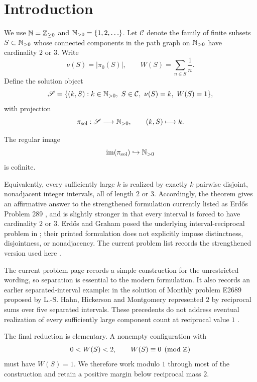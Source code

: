 \section{Introduction}
\label{sec:introduction}

We use $\mathbb N=\mathbb Z_{\ge0}$ and $\mathbb N_{>0}=\{1,2,\ldots\}$.  Let $\mathcal C$ denote the family of finite subsets $S\subset\mathbb N_{>0}$ whose connected components in the path graph on $\mathbb N_{>0}$ have cardinality $2$ or $3$.  Write
\[
\nu(S)=|\pi_0(S)|,
\qquad
W(S)=\sum_{n\in S}\frac1n.
\]
Define the solution object
\begin{equation}\label{eq:solution-object}
\mathscr S
=
\{(k,S):k\in\mathbb N_{>0},\ S\in\mathcal C,\ \nu(S)=k,\ W(S)=1\},
\end{equation}
with projection
\[
\pi_{\mathrm{sol}}:\mathscr S\longrightarrow\mathbb N_{>0},
\qquad
(k,S)\longmapsto k.
\]

\begin{theorem}\label{thm:main}
The regular image
\begin{equation}\label{eq:main-regular-image}
\operatorname{im}(\pi_{\mathrm{sol}})
\hookrightarrow\mathbb N_{>0}
\end{equation}
is cofinite.
\end{theorem}

Equivalently, every sufficiently large $k$ is realized by exactly $k$ pairwise disjoint, nonadjacent integer intervals, all of length $2$ or $3$.  Accordingly, the theorem gives an affirmative answer to the strengthened formulation currently listed as Erd\H{o}s Problem 289 \cite{ErdosProblem289}, and is slightly stronger in that every interval is forced to have cardinality $2$ or $3$.  Erd\H{o}s and Graham posed the underlying interval-reciprocal problem in \cite[p.~34]{ErdosGraham1980}; their printed formulation does not explicitly impose distinctness, disjointness, or nonadjacency.  The current problem list records the strengthened version used here \cite{ErdosProblem289}.

The current problem page records a simple construction for the unrestricted wording, so separation is essential to the modern formulation.  It also records an earlier separated-interval example: in the solution of Monthly problem E2689 proposed by L.-S. Hahn, Hickerson and Montgomery represented $2$ by reciprocal sums over five separated intervals.  These precedents do not address eventual realization of every sufficiently large component count at reciprocal value $1$ \cite{ErdosProblem289}.

The final reduction is elementary.  A nonempty configuration with
\[
0<W(S)<2,
\qquad
W(S)\equiv0\pmod{\mathbb Z}
\]
must have $W(S)=1$.  We therefore work modulo $1$ through most of the construction and retain a positive margin below reciprocal mass $2$.

